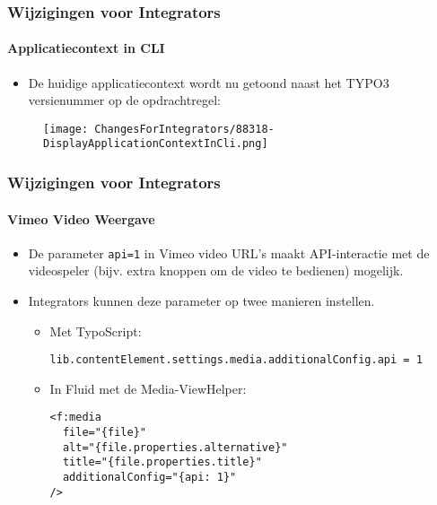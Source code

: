 
\begin{frame}[fragile]
	\frametitle{Wijzigingen voor Integrators}
	\framesubtitle{Applicatiecontext in CLI}

	\begin{itemize}
		\item De huidige applicatiecontext wordt nu getoond naast het
			TYPO3 versienummer op de opdrachtregel:
	\end{itemize}

	\begin{figure}
		\texttt{[image: ChangesForIntegrators/88318-DisplayApplicationContextInCli.png]}
	\end{figure}

\end{frame}


\begin{frame}[fragile]
	\frametitle{Wijzigingen voor Integrators}
	\framesubtitle{Vimeo Video Weergave}

	\lstset{basicstyle=\smaller\ttfamily}

	\begin{itemize}
		\item De parameter \texttt{api=1} in Vimeo video URL's maakt API-interactie met de videospeler
		(bijv. extra knoppen om de video te bedienen) mogelijk.
		\item Integrators kunnen deze parameter op twee manieren instellen.

		\begin{itemize}
			\item Met TypoScript:

\begin{lstlisting}
lib.contentElement.settings.media.additionalConfig.api = 1
\end{lstlisting}

			\item In Fluid met de Media-ViewHelper:

\begin{lstlisting}
<f:media
  file="{file}"
  alt="{file.properties.alternative}"
  title="{file.properties.title}"
  additionalConfig="{api: 1}"
/>
\end{lstlisting}

		\end{itemize}
	\end{itemize}

\end{frame}


